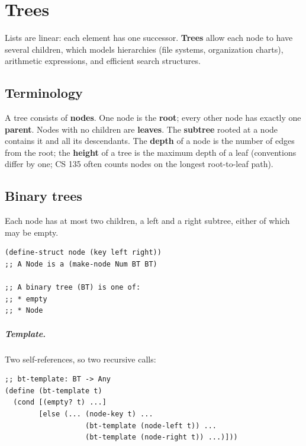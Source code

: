 \chapter{Trees}\label{ch:trees}


Lists are linear: each element has one successor. \textbf{Trees} allow each
node to have several children, which models hierarchies (file systems,
organization charts), arithmetic expressions, and efficient search structures.

\section{Terminology}
A tree consists of \textbf{nodes}. One node is the \textbf{root}; every other
node has exactly one \textbf{parent}. Nodes with no children are
\textbf{leaves}. The \textbf{subtree} rooted at a node contains it and all its
descendants. The \textbf{depth} of a node is the number of edges from the
root; the \textbf{height} of a tree is the maximum depth of a leaf (conventions
differ by one; CS 135 often counts nodes on the longest root-to-leaf path).

\section{Binary trees}
Each node has at most two children, a left and a right subtree, either of
which may be empty.

\begin{lstlisting}[style=racket]
(define-struct node (key left right))
;; A Node is a (make-node Num BT BT)

;; A binary tree (BT) is one of:
;; * empty
;; * Node
\end{lstlisting}

\paragraph{Template.} Two self-references, so two recursive calls:
\begin{lstlisting}[style=racket]
;; bt-template: BT -> Any
(define (bt-template t)
  (cond [(empty? t) ...]
        [else (... (node-key t) ...
                   (bt-template (node-left t)) ...
                   (bt-template (node-right t)) ...)]))
\end{lstlisting}

